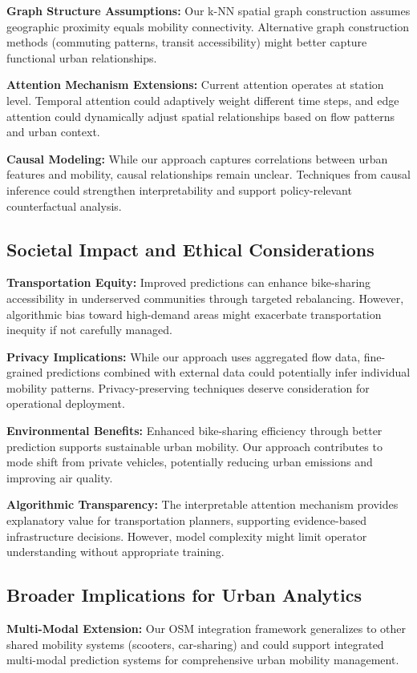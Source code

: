 \documentclass{article}
\begin{document}
\textbf{Graph Structure Assumptions:} Our k-NN spatial graph construction assumes geographic proximity equals mobility connectivity. Alternative graph construction methods (commuting patterns, transit accessibility) might better capture functional urban relationships.

\textbf{Attention Mechanism Extensions:} Current attention operates at station level. Temporal attention could adaptively weight different time steps, and edge attention could dynamically adjust spatial relationships based on flow patterns and urban context.

\textbf{Causal Modeling:} While our approach captures correlations between urban features and mobility, causal relationships remain unclear. Techniques from causal inference could strengthen interpretability and support policy-relevant counterfactual analysis.

\subsection{Societal Impact and Ethical Considerations}
\textbf{Transportation Equity:} Improved predictions can enhance bike-sharing accessibility in underserved communities through targeted rebalancing. However, algorithmic bias toward high-demand areas might exacerbate transportation inequity if not carefully managed.

\textbf{Privacy Implications:} While our approach uses aggregated flow data, fine-grained predictions combined with external data could potentially infer individual mobility patterns. Privacy-preserving techniques deserve consideration for operational deployment.

\textbf{Environmental Benefits:} Enhanced bike-sharing efficiency through better prediction supports sustainable urban mobility. Our approach contributes to mode shift from private vehicles, potentially reducing urban emissions and improving air quality.

\textbf{Algorithmic Transparency:} The interpretable attention mechanism provides explanatory value for transportation planners, supporting evidence-based infrastructure decisions. However, model complexity might limit operator understanding without appropriate training.

\subsection{Broader Implications for Urban Analytics}
\textbf{Multi-Modal Extension:} Our OSM integration framework generalizes to other shared mobility systems (scooters, car-sharing) and could support integrated multi-modal prediction systems for comprehensive urban mobility management.
\end{document}
